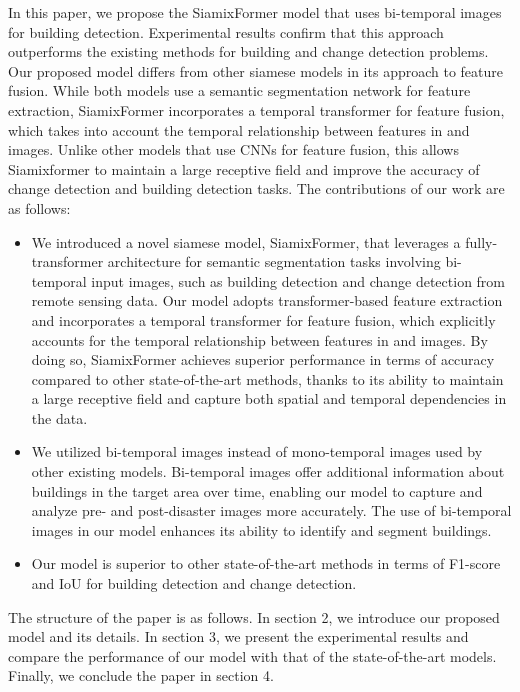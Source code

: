 \documentclass{article}
\begin{document}
In this paper, we propose the SiamixFormer model that uses bi-temporal images for building detection. Experimental results confirm that this approach outperforms the existing methods for building and change detection problems. Our proposed model differs from other siamese models in its approach to feature fusion. While both models use a semantic segmentation network for feature extraction, SiamixFormer incorporates a temporal transformer for feature fusion, which takes into account the temporal relationship between features in  and  images. Unlike other models that use CNNs for feature fusion, this allows Siamixformer to maintain a large receptive field and improve the accuracy of change detection and building detection tasks. The contributions of our work are as follows:
\begin{itemize}
	\item We introduced a novel siamese model, SiamixFormer, that leverages a fully-transformer architecture for semantic segmentation tasks involving bi-temporal input images, such as building detection and change detection from remote sensing data. Our model adopts transformer-based feature extraction and incorporates a temporal transformer for feature fusion, which explicitly accounts for the temporal relationship between features in  and  images. By doing so, SiamixFormer achieves superior performance in terms of accuracy compared to other state-of-the-art methods, thanks to its ability to maintain a large receptive field and capture both spatial and temporal dependencies in the data.
	\item We utilized bi-temporal images instead of mono-temporal images used by other existing models. Bi-temporal images offer additional information about buildings in the target area over time, enabling our model to capture and analyze pre- and post-disaster images more accurately. The use of bi-temporal images in our model enhances its ability to identify and segment buildings.
	\item Our model is superior to other state-of-the-art methods in terms of F1-score and IoU for building detection and change detection.
\end{itemize}

The structure of the paper is as follows. In section 2, we introduce our proposed model and its details. In section 3, we present the experimental results and compare the performance of our model with that of the state-of-the-art models. Finally, we conclude the paper in section 4.
\end{document}
